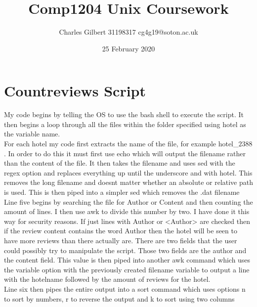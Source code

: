\documentclass{report}
\title{Comp1204 Unix Coursework}
\author{Charles Gilbert 31198317 cg4g19@soton.ac.uk}
\date{25 February 2020}
\begin{document}
\maketitle
\lstset{language=Bash}
\section{Countreviews Script}

My code begins by telling the OS to use the bash shell to execute the script. It then begins a loop through all the files within the folder specified using hotel as the variable name.\\

For each hotel my code first extracts the name of the file, for example hotel\_$2388$. In order to do this it must first use echo which will output the filename rather than the content of the file. It then takes the filename and uses sed with the regex option and replaces everything up until the underscore and with hotel. This removes the long filename and doesnt matter whether an absolute or relative path is used. This is then piped into a simpler sed which removes the .dat filename\\

Line five begins by searching the file for Author or Content and then counting the amount of lines. I then use awk to divide this number by two. I have done it this way for security reasons. If just lines with Author or <Author> are checked then if the review content contains the word Author then the hotel will be seen to have more reviews than there actually are. There are two fields that the user could possibly try to manipulate the script. Those two fields are the author and the content field. This value is then piped into another awk command which uses the variable option with the previously created filename variable to output a line with the hotelname followed by the amount of reviews for the hotel.\\

Line six then pipes the entire output into a sort command which uses options n to sort by numbers, r to reverse the output and k to sort using two columns

\lstset{numbers=left,
	stepnumber=1}

\end{document}
